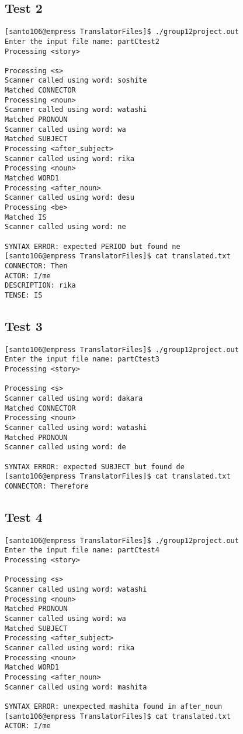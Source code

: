 \documentclass{article}
\begin{document}
	\subsection{Test 2}
	\begin{Verbatim}
[santo106@empress TranslatorFiles]$ ./group12project.out
Enter the input file name: partCtest2
Processing <story>

Processing <s>
Scanner called using word: soshite
Matched CONNECTOR
Processing <noun>
Scanner called using word: watashi
Matched PRONOUN
Scanner called using word: wa
Matched SUBJECT
Processing <after_subject>
Scanner called using word: rika
Processing <noun>
Matched WORD1
Processing <after_noun>
Scanner called using word: desu
Processing <be>
Matched IS
Scanner called using word: ne

SYNTAX ERROR: expected PERIOD but found ne
[santo106@empress TranslatorFiles]$ cat translated.txt
CONNECTOR: Then
ACTOR: I/me
DESCRIPTION: rika
TENSE: IS
	\end{Verbatim}
	
	\subsection{Test 3}
	\begin{Verbatim}
[santo106@empress TranslatorFiles]$ ./group12project.out
Enter the input file name: partCtest3
Processing <story>

Processing <s>
Scanner called using word: dakara
Matched CONNECTOR
Processing <noun>
Scanner called using word: watashi
Matched PRONOUN
Scanner called using word: de

SYNTAX ERROR: expected SUBJECT but found de
[santo106@empress TranslatorFiles]$ cat translated.txt
CONNECTOR: Therefore
	\end{Verbatim}
	
	\subsection{Test 4}
	\begin{Verbatim}
[santo106@empress TranslatorFiles]$ ./group12project.out
Enter the input file name: partCtest4
Processing <story>

Processing <s>
Scanner called using word: watashi
Processing <noun>
Matched PRONOUN
Scanner called using word: wa
Matched SUBJECT
Processing <after_subject>
Scanner called using word: rika
Processing <noun>
Matched WORD1
Processing <after_noun>
Scanner called using word: mashita

SYNTAX ERROR: unexpected mashita found in after_noun
[santo106@empress TranslatorFiles]$ cat translated.txt
ACTOR: I/me
	\end{Verbatim}
	
\end{document}
